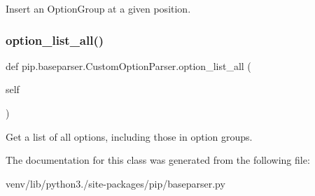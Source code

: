 \begin{DoxyVerb}Insert an OptionGroup at a given position.\end{DoxyVerb}
 \mbox{\label{classpip_1_1baseparser_1_1_custom_option_parser_a77293828b350e872ae1f6c69d2d239f9}} 
\subsubsection{\texorpdfstring{option\+\_\+list\+\_\+all()}{option\_list\_all()}}
{\footnotesize\ttfamily def pip.\+baseparser.\+Custom\+Option\+Parser.\+option\+\_\+list\+\_\+all (\begin{DoxyParamCaption}\item[{}]{self }\end{DoxyParamCaption})}

\begin{DoxyVerb}Get a list of all options, including those in option groups.\end{DoxyVerb}
 

The documentation for this class was generated from the following file\+:\begin{DoxyCompactItemize}
\item 
venv/lib/python3./site-\/packages/pip/baseparser.\+py\end{DoxyCompactItemize}
